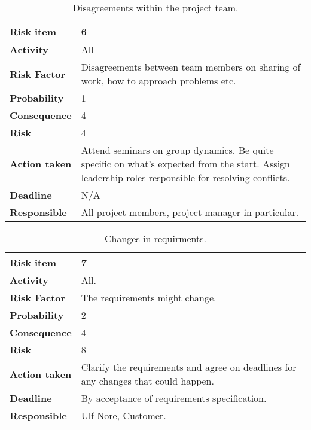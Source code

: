 \begin{table}[htdp]
\begin{center}
\begin{tabularx}{\textwidth}{| X | X |}
\hline
\textbf{Risk item} & 6 \\
\hline
\textbf{Activity} & All \\
\hline
\textbf{Risk Factor} & Disagreements between team members on sharing of work, how to approach problems etc. \\
\hline
\textbf{Probability} & 1 \\
\hline
\textbf{Consequence} & 4 \\
\hline
\textbf{Risk} & 4 \\
\hline
\textbf{Action taken} & Attend seminars on group dynamics. Be quite specific on what's expected from the start. Assign leadership roles responsible for resolving conflicts. \\
\hline
\textbf{Deadline} & N/A \\
\hline
\textbf{Responsible} & All project members, project manager in particular. \\
\hline
\end{tabularx}
\caption{Disagreements within the project team.}
\end{center}
\label{risk_9}
\end{table}




\begin{table}[htdp]
\begin{center}
\begin{tabularx}{\textwidth}{| X | X |}
\hline
\textbf{Risk item} & 7 \\
\hline
\textbf{Activity} & All. \\
\hline
\textbf{Risk Factor} & The requirements might change. \\
\hline
\textbf{Probability} & 2 \\
\hline
\textbf{Consequence} & 4 \\
\hline
\textbf{Risk} & 8 \\
\hline
\textbf{Action taken} & Clarify the requirements and agree on deadlines for any changes that could happen.\\
\hline
\textbf{Deadline} & By acceptance of requirements specification. \\
\hline
\textbf{Responsible} & Ulf Nore, Customer. \\
\hline
\end{tabularx}
\caption{Changes in requirments.}
\end{center}
\label{risk_1}
\end{table}


